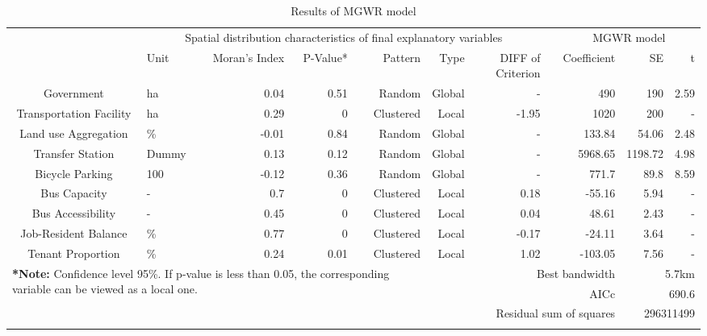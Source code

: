 \documentclass[utf8]{article}
\begin{document}
\begin{table}
	\centering
	\caption{Results of MGWR model}
	\label{tab:ResultMGWR}%
	\begin{tabular}{clrrrrrrrrr}
		\Xhline{1.5pt}
		\multicolumn{1}{c}{\multirow{2}[4]{*}{Variable}} & \multicolumn{6}{c}{Spatial distribution characteristics of final explanatory variables} & & \multicolumn{3}{c}{MGWR model} \\
		
		\cmidrule{2-7}\cmidrule{9-11}
		
		& \multicolumn{1}{p{3em}}{Unit} & \multicolumn{1}{p{4em}}{Moran's Index} & P-Value* & Pattern & Type & \multicolumn{1}{p{4em}}{DIFF of Criterion} & & Coefficient & SE & t \\
	
		\cmidrule{1-7}\cmidrule{9-11}
		
		Government & ha & 0.04 & 0.51 & Random & Global &- & & 490 & 190 & 2.59 \\
		Transportation Facility & ha & 0.29 & 0 & Clustered & Local & -1.95 & & 1020 & 200 & - \\
		Land use Aggregation & \% & -0.01 & 0.84 & Random & Global & - & & 133.84 & 54.06 & 2.48 \\
		Transfer Station & Dummy & 0.13 & 0.12 & Random & Global & - & & 5968.65 & 1198.72 & 4.98 \\
		Bicycle Parking & 100 & -0.12 & 0.36 & Random & Global & - & & 771.7 & 89.8 & 8.59 \\
		Bus Capacity & - & 0.7 & 0 & Clustered & Local & 0.18  & & -55.16 & 5.94  & - \\
		Bus Accessibility & - & 0.45 & 0 &  Clustered & Local & 0.04 & & 48.61 & 2.43 & - \\
		Job-Resident Balance & \% & 0.77 & 0 & Clustered & Local & -0.17 & & -24.11 & 3.64 & - \\
		Tenant Proportion & \% & 0.24 & 0.01 & Clustered & Local & 1.02 & & -103.05 & 7.56 & - \\
		
		\midrule
		
		\multicolumn{5}{l}{\multirow{3}[2]{30em}{\textbf{*Note:} Confidence level 95\%. If p-value is less than 0.05, the corresponding variable can be viewed as a local one.}} & \multicolumn{4}{r}{Best bandwidth} & \multicolumn{2}{r}{5.7km} \\
		\multicolumn{5}{l}{} & \multicolumn{4}{r}{AICc} & \multicolumn{2}{r}{690.6} \\
		\multicolumn{5}{l}{} & \multicolumn{4}{r}{Residual sum of squares} & \multicolumn{2}{r}{296311499} \\
		
		\Xhline{1.5pt}
	\end{tabular}%
\end{table}%
\end{document}
